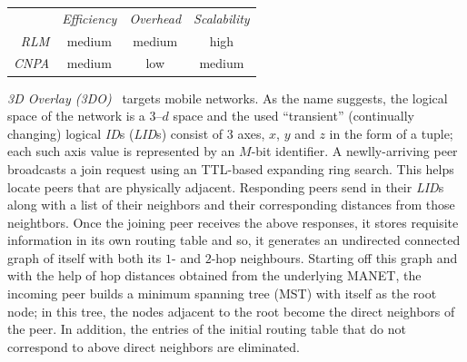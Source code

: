\begin{center}
{\footnotesize
\begin{tabular}{rccc}
\multicolumn{1}{r}{} &
\multicolumn{1}{c}{\emph{Efficiency}} &
\multicolumn{1}{c}{\emph{Overhead}} &
\multicolumn{1}{c}{\emph{Scalability}}
\\
\cline{2-4}
\emph{RLM} &
medium &
%
medium &
high \\
\emph{CNPA} &
%
medium &
low &
medium \\
\end{tabular}
}
\end{center}

\emph{3D Overlay (3DO)}~\cite{AOS2014} targets mobile networks.
As the name suggests, the logical space of the network is 
a $3$--$d$ space and the used ``transient'' (continually changing) 
logical \emph{ID}s (\emph{LID}s) consist of $3$ axes, $x$, $y$ and $z$ 
in the form of a tuple;
each such axis value is represented by an $M$-bit identifier.
A newlly-arriving peer broadcasts a join request using
an TTL-based expanding ring search. 
This helps locate peers that are physically adjacent.
Responding peers send in 
their \emph{LID}s along with a list of their neighbors 
and their corresponding distances from those neightbors. 
Once the joining peer receives the above responses,
it stores requisite information in its own routing table 
and so, it generates an undirected connected
graph of itself with both its $1$- and $2$-hop neighbours. 
Starting off this graph and with the help of hop 
distances obtained from the underlying MANET,
the incoming peer builds a minimum spanning tree (MST)
with itself as the root node; 
in this tree, the nodes adjacent to the root become the
direct neighbors of the peer.
In addition, the entries of the initial routing table 
that do not correspond to above direct neighbors are
eliminated.

